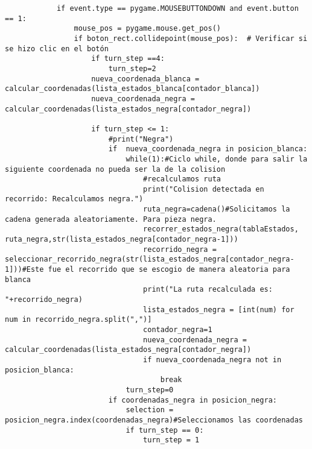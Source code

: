 \begin{lstlisting}
            if event.type == pygame.MOUSEBUTTONDOWN and event.button == 1:
                mouse_pos = pygame.mouse.get_pos()
                if boton_rect.collidepoint(mouse_pos):  # Verificar si se hizo clic en el botón
                    if turn_step ==4:
                        turn_step=2
                    nueva_coordenada_blanca = calcular_coordenadas(lista_estados_blanca[contador_blanca])
                    nueva_coordenada_negra = calcular_coordenadas(lista_estados_negra[contador_negra])
                    
                    if turn_step <= 1:
                        #print("Negra")
                        if  nueva_coordenada_negra in posicion_blanca:
                            while(1):#Ciclo while, donde para salir la siguiente coordenada no pueda ser la de la colision
                                #recalculamos ruta
                                print("Colision detectada en recorrido: Recalculamos negra.")
                                ruta_negra=cadena()#Solicitamos la cadena generada aleatoriamente. Para pieza negra.
                                recorrer_estados_negra(tablaEstados, ruta_negra,str(lista_estados_negra[contador_negra-1]))
                                recorrido_negra = seleccionar_recorrido_negra(str(lista_estados_negra[contador_negra-1]))#Este fue el recorrido que se escogio de manera aleatoria para blanca
                                print("La ruta recalculada es: "+recorrido_negra)
                                lista_estados_negra = [int(num) for num in recorrido_negra.split(",")]
                                contador_negra=1
                                nueva_coordenada_negra = calcular_coordenadas(lista_estados_negra[contador_negra])
                                if nueva_coordenada_negra not in posicion_blanca:
                                    break
                            turn_step=0
                        if coordenadas_negra in posicion_negra:
                            selection = posicion_negra.index(coordenadas_negra)#Seleccionamos las coordenadas
                            if turn_step == 0:
                                turn_step = 1
                        

\end{lstlisting}
